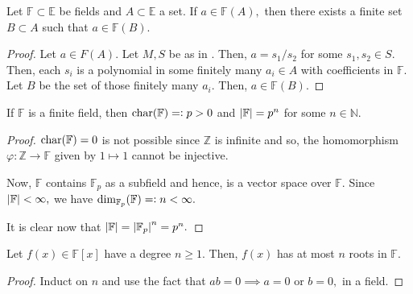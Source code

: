 \begin{cor} \label{cor:FAdescfinite}
    Let $\mathbb{F} \subset \mathbb{E}$ be fields and $A \subset \mathbb{E}$ a set. If $a \in \mathbb{F}(A),$ then there exists a finite set $B \subset A$ such that $a \in \mathbb{F}(B).$
\end{cor}

\begin{proof} 
    Let $a \in F(A).$ Let $M, S$ be as in . Then, $a = s_1/s_2$ for some $s_1, s_2 \in S.$ Then, each $s_i$ is a polynomial in some finitely many $a_i \in A$ with coefficients in $\mathbb{F}.$ Let $B$ be the set of those finitely many $a_i.$ Then, $a \in \mathbb{F}(B).$
\end{proof}

\begin{prop}
    If $\mathbb{F}$ is a finite field, then $\operatorname{char}(\mathbb{F}) =\vcentcolon p > 0$ and ${\left\lvert \mathbb{F} \right\lvert} = p^n$ for some $n \in \mathbb{N}.$
\end{prop}
\begin{proof} 
    $\operatorname{char}(\mathbb{F}) = 0$ is not possible since $\mathbb{Z}$ is infinite and so, the homomorphism $\varphi : \mathbb{Z} \to \mathbb{F}$ given by $1 \mapsto 1$ cannot be injective.

    Now, $\mathbb{F}$ contains $\mathbb{F}_p$ as a subfield and hence, is a vector space over $\mathbb{F}.$ Since ${\left\lvert \mathbb{F} \right\lvert} < \infty,$ we have $\dim_{\mathbb{F}_p}(\mathbb{F}) =\vcentcolon n < \infty.$

    It is clear now that ${\left\lvert \mathbb{F} \right\lvert} = {\left\lvert \mathbb{F}_p \right\lvert}^n = p^n.$
\end{proof}

\begin{thm} \label{thm:numberofrootsinfield}
    Let $f(x) \in \mathbb{F}[x]$ have a degree $n \ge 1.$ Then, $f(x)$ has at most $n$ roots in $\mathbb{F}.$
\end{thm}
\begin{proof} 
    Induct on $n$ and use the fact that $ab = 0 \implies a = 0$ or $b = 0,$ in a field.
\end{proof}

